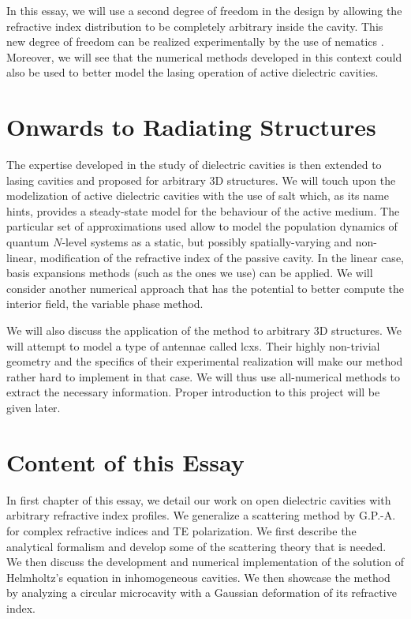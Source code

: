 In this essay, we will use a second degree of freedom in the design
by allowing the refractive index distribution to be completely
arbitrary inside the cavity. This new degree of freedom can be realized
experimentally by the use of nematics \cite{PTA2013}. 
Moreover, we will see that the numerical
methods developed in this context could also be used to better model the lasing 
operation of active dielectric cavities.

\section{Onwards to Radiating Structures}
The expertise developed in the study of dielectric cavities is then
extended to lasing cavities and proposed for arbitrary
3D structures. We will touch upon the modelization of active
dielectric cavities with the use of \gls{salt} which, as its name
hints, provides a steady-state model for the behaviour of the 
active medium. The particular set of approximations used 
allow to model the population dynamics of quantum $N$-level
systems as a static, but possibly spatially-varying and non-linear, 
modification of the refractive index of the passive cavity. 
In the linear case, basis expansions methods (such as the ones
we use) can be applied. We will consider another numerical approach
that has the potential to better compute the interior field, the
variable phase method. 

We will also discuss the application of the method to arbitrary 
3D structures. We will attempt to model a type of antennae 
called \glspl{lcx}. Their highly non-trivial geometry and the specifics
of their experimental realization will make our method rather hard 
to implement in that case. We will thus use all-numerical methods 
to extract the necessary information. Proper introduction to this project
will be given later.

\section{Content of this Essay}

In first chapter of this essay, we detail our work on open
dielectric cavities with arbitrary refractive index profiles. 
We generalize a scattering method by G.P.-A. \cite{GAP2013a} for 
complex refractive indices and TE polarization. We first describe
the analytical formalism and develop some of the scattering theory 
that is needed. We then discuss the development and numerical implementation
of the solution of Helmholtz's equation in inhomogeneous cavities. 
We then showcase the method by analyzing a circular microcavity with a 
Gaussian deformation of its refractive index. 

